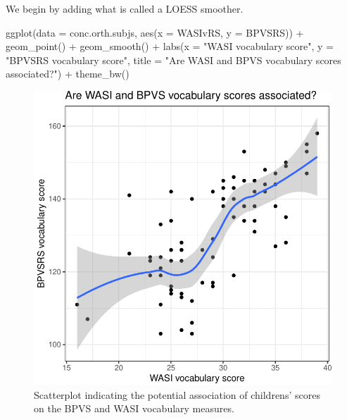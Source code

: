 \documentclass[
  letterpaper,
  DIV=11,
  numbers=noendperiod]{scrreprt}
\newenvironment{Shaded}{\begin{snugshade}}{\end{snugshade}}
\newcommand{\AttributeTok}[1]{\textcolor[rgb]{0.40,0.45,0.13}{#1}}
\newcommand{\FunctionTok}[1]{\textcolor[rgb]{0.28,0.35,0.67}{#1}}
\newcommand{\NormalTok}[1]{\textcolor[rgb]{0.00,0.23,0.31}{#1}}
\newcommand{\SpecialCharTok}[1]{\textcolor[rgb]{0.37,0.37,0.37}{#1}}
\newcommand{\StringTok}[1]{\textcolor[rgb]{0.13,0.47,0.30}{#1}}
\begin{document}
We begin by adding what is called a LOESS smoother.

\begin{Shaded}
\begin{Highlighting}[numbers=left,,]
\FunctionTok{ggplot}\NormalTok{(}\AttributeTok{data =}\NormalTok{ conc.orth.subjs, }\FunctionTok{aes}\NormalTok{(}\AttributeTok{x =}\NormalTok{ WASIvRS, }\AttributeTok{y =}\NormalTok{ BPVSRS)) }\SpecialCharTok{+}
  \FunctionTok{geom\_point}\NormalTok{() }\SpecialCharTok{+}
  \FunctionTok{geom\_smooth}\NormalTok{() }\SpecialCharTok{+}
  \FunctionTok{labs}\NormalTok{(}\AttributeTok{x =} \StringTok{"WASI vocabulary score"}\NormalTok{, }
       \AttributeTok{y =} \StringTok{"BPVSRS vocabulary score"}\NormalTok{,}
       \AttributeTok{title =} \StringTok{"Are WASI and BPVS vocabulary scores associated?"}\NormalTok{) }\SpecialCharTok{+}
  \FunctionTok{theme\_bw}\NormalTok{()}
\end{Highlighting}
\end{Shaded}

\begin{figure}[H]

{\centering \includegraphics{visualization_files/figure-pdf/fig-scatter-BPVS-WASI-loess-1.pdf}

}

\caption{\label{fig-scatter-BPVS-WASI-loess}Scatterplot indicating the
potential association of childrens' scores on the BPVS and WASI
vocabulary measures.}

\end{figure}
\end{document}

